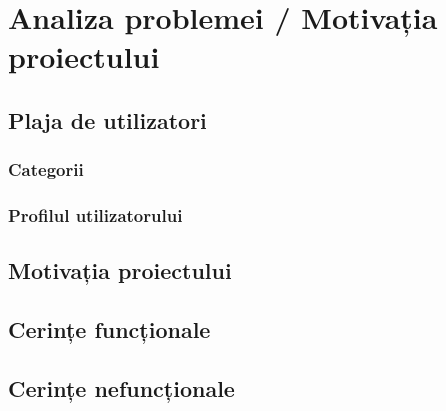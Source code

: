 \chapter{Analiza problemei / Motivația proiectului}
\label{chapter:analiza}

\section{Plaja de utilizatori}
\label{sec:proj}

\subsection{Categorii}
\label{sub-sec:proj-scope}

\subsection{Profilul utilizatorului}
\label{sub-sec:proj-user-profile}

\section{Motivația proiectului}
\section{Cerințe funcționale}
\section{Cerințe nefuncționale}

